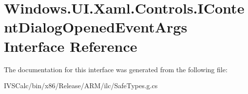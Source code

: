 \hypertarget{interface_windows_1_1_u_i_1_1_xaml_1_1_controls_1_1_i_content_dialog_opened_event_args}{}\section{Windows.\+U\+I.\+Xaml.\+Controls.\+I\+Content\+Dialog\+Opened\+Event\+Args Interface Reference}
\label{interface_windows_1_1_u_i_1_1_xaml_1_1_controls_1_1_i_content_dialog_opened_event_args}


The documentation for this interface was generated from the following file\+:\begin{DoxyCompactItemize}
\item 
I\+V\+S\+Calc/bin/x86/\+Release/\+A\+R\+M/ilc/Safe\+Types.\+g.\+cs\end{DoxyCompactItemize}
